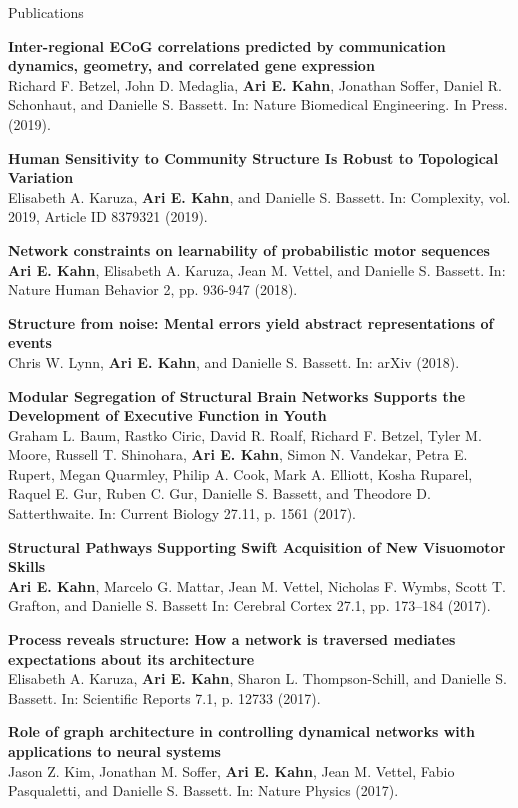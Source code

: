 \documentclass{resume} %
\begin{document}
\begin{rSection}{Publications}

\textbf{Inter-regional ECoG correlations predicted by communication dynamics, geometry, and correlated gene expression} \\
Richard F. Betzel, John D. Medaglia, \textbf{Ari E. Kahn}, Jonathan Soffer, Daniel R. Schonhaut, and Danielle S. Bassett. In: Nature Biomedical Engineering. In Press. (2019).

\textbf{Human Sensitivity to Community Structure Is Robust to Topological Variation} \\
Elisabeth A. Karuza, \textbf{Ari E. Kahn}, and Danielle S. Bassett. In: Complexity, vol. 2019, Article ID 8379321 (2019).

\textbf{Network constraints on learnability of probabilistic motor sequences} \\
\textbf{Ari E. Kahn}, Elisabeth A. Karuza, Jean M. Vettel, and Danielle S. Bassett. In: Nature Human Behavior 2, pp. 936-947 (2018).

\textbf{Structure from noise: Mental errors yield abstract representations of events} \\
Chris W. Lynn, \textbf{Ari E. Kahn}, and Danielle S. Bassett. In: arXiv (2018).


\textbf{Modular Segregation of Structural Brain Networks Supports the Development of Executive Function in Youth} \\
Graham L. Baum, Rastko Ciric, David R. Roalf, Richard F. Betzel, Tyler M. Moore, Russell T. Shinohara, \textbf{Ari E. Kahn}, Simon N. Vandekar, Petra E. Rupert, Megan Quarmley, Philip A. Cook, Mark A. Elliott, Kosha Ruparel, Raquel E. Gur, Ruben C. Gur, Danielle S. Bassett, and Theodore D. Satterthwaite. In: Current Biology 27.11, p. 1561 (2017).

\textbf{Structural Pathways Supporting Swift Acquisition of New Visuomotor Skills} \\
\textbf{Ari E. Kahn}, Marcelo G. Mattar, Jean M. Vettel, Nicholas F. Wymbs, Scott T. Grafton, and Danielle S. Bassett In: Cerebral Cortex 27.1, pp. 173–184 (2017).

\textbf{Process reveals structure: How a network is traversed mediates expectations about its architecture} \\
Elisabeth A. Karuza, \textbf{Ari E. Kahn}, Sharon L. Thompson-Schill, and Danielle S. Bassett. In: Scientific Reports 7.1, p. 12733 (2017).

\textbf{Role of graph architecture in controlling dynamical networks with applications to neural systems} \\
Jason Z. Kim, Jonathan M. Soffer, \textbf{Ari E. Kahn}, Jean M. Vettel, Fabio Pasqualetti, and Danielle S. Bassett. In: Nature Physics (2017).


\end{rSection}
\end{document}
